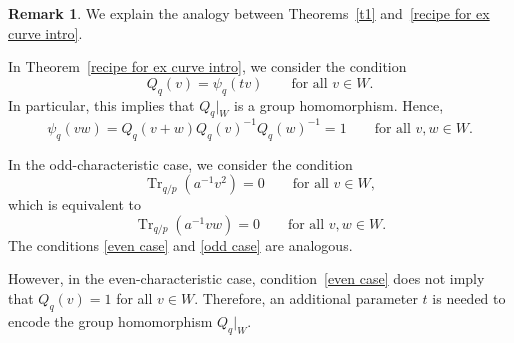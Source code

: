 \documentclass[12pt,a4paper]{amsart}
\theoremstyle{definition}
\newtheorem{remark}[theorem]{Remark}
\theoremstyle{remark}
\DeclareMathOperator{\Tr}{Tr}
\begin{document}
\begin{remark}
We explain the analogy between Theorems~\ref{t1} and~\ref{recipe for ex curve intro}. 

In Theorem~\ref{recipe for ex curve intro}, we consider the condition 
\[
    Q_q(v)=\psi_q(tv)\qquad\text{for all } v\in W. 
    \]
In particular, this implies that $Q_q|_W$ is a group homomorphism. Hence, 
\begin{equation}\label{even case}
\psi_q(vw)=Q_q(v+w)Q_q(v)^{-1}Q_q(w)^{-1}=1 \qquad\text{for all }v,w\in W.
\end{equation}
 
In the odd-characteristic case, we consider the condition 
\[
\Tr_{q/p}(a^{-1}v^2)=0\qquad\text{for all }v\in W, 
\]
which is equivalent to 
\begin{equation}\label{odd case}
    \Tr_{q/p}(a^{-1}vw)=0\qquad\text{for all }v,w\in W. 
\end{equation}
The conditions \eqref{even case} and \eqref{odd case} are analogous. 

However, in the even-characteristic case, condition~\eqref{even case} does not imply that $Q_q(v)=1$ for all $v\in W$. Therefore, an additional parameter $t$ is needed to encode the group homomorphism $Q_q|_W$.
\end{remark}
\end{document}
